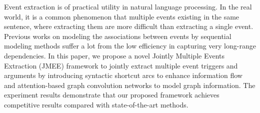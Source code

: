 Event extraction is of practical utility in natural language processing. In the real world, it is a common phenomenon that multiple events existing in the same sentence, where extracting them are more difficult than extracting a single event. Previous works on modeling the associations between events by sequential modeling methods suffer a lot from the low efficiency in capturing very long-range dependencies. In this paper, we propose a novel Jointly Multiple Events Extraction (JMEE) framework to jointly extract multiple event triggers and arguments by introducing syntactic shortcut arcs to enhance information flow and attention-based graph convolution networks to model graph information. The experiment results demonstrate that our proposed framework achieves competitive results compared with state-of-the-art methods.
